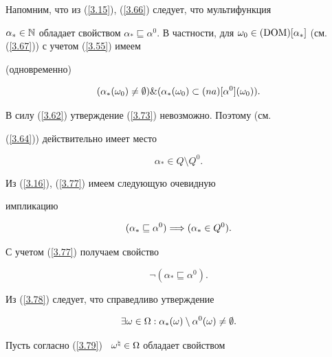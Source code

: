 \begin{pf}
Напомним, что из (\ref{3.15}), (\ref{3.66}) следует, что мультифункция


${{\alpha}_*} \in \Bbb{N}$ обладает свойством ${{\alpha}_*}


\sqsubseteq {{\alpha}^0}$. В частности, для ${{\omega}_0} \in


(\DOM)[{\alpha}_*]$ (см. (\ref{3.67})) с учетом (\ref{3.55}) имеем


(одновременно)


\begin{equation}\label{3.73}


({{\alpha}_*}({\omega}_0) \ne \emp) \& ({{\alpha}_*}({\omega}_0)


\subset (na)[{\alpha}^0]({\omega}_0)).


\end{equation}


В силу (\ref{3.62}) утверждение (\ref{3.73}) невозможно. Поэтому (см.


(\ref{3.64})) действительно имеет место


\begin{equation}\label{3.77}


{{\alpha}_*} \in Q \setminus {Q^0}.


\end{equation}


Из (\ref{3.16}), (\ref{3.77}) имеем следующую очевидную


импликацию


$$


({{\alpha}_*} \sqsubseteq {{\alpha}^0}) \Lo ({{\alpha}_*}\in {Q^0}).


$$


С учетом (\ref{3.77}) получаем свойство


\begin{equation}\label{3.78}


\neg ({\alpha}_* \sqsubseteq {{\alpha}^0}).


\end{equation}


Из (\ref{3.78}) следует, что справедливо утверждение


\begin{equation}\label{3.79}


\exi{\omega} \in \Om:{{\alpha}_*}(\omega) \setminus


{{\alpha}^0}(\omega) \ne \emp.


\end{equation}


Пусть согласно (\ref{3.79}) \ ${\omega}^\natural \in \Omega$ обладает свойством



\end{pf}
